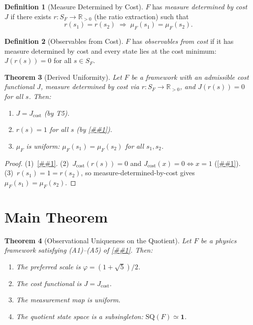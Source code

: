 \documentclass[11pt]{article}
\providecommand{\cref}[1]{\ref{##1}}%
\providecommand{\Cref}[1]{\ref{##1}}%
\newcommand{\Rp}{\mathbb{R}_{>0}}
\newcommand{\Jcost}{J_{\mathrm{cost}}}
\newcommand{\SQ}{\mathrm{SQ}}
\newtheorem{theorem}{Theorem}[section]
\theoremstyle{definition}
\newtheorem{definition}[theorem]{Definition}
\theoremstyle{remark}
\begin{document}
\begin{definition}[Measure Determined by Cost]\label{def:measure-by-cost}
$F$ has \emph{measure determined by cost} $J$ if there exists
$r : S_F \to \Rp$ (the ratio extraction) such that
\[
r(s_1) = r(s_2) \;\Longrightarrow\; \mu_F(s_1) = \mu_F(s_2).
\]
\end{definition}

\begin{definition}[Observables from Cost]\label{def:obs-from-cost}
$F$ has \emph{observables from cost} if it has measure determined
by cost and every state lies at the cost minimum:
$J(r(s)) = 0$ for all $s \in S_F$.
\end{definition}

\begin{theorem}[Derived Uniformity]\label{thm:derived-uniform}
Let $F$ be a framework with an admissible cost functional $J$,
measure determined by cost via $r : S_F \to \Rp$,
and $J(r(s)) = 0$ for all $s$.
Then:
\begin{enumerate}
\item $J = \Jcost$ \;\textup{(}by T5\textup{)}.
\item $r(s) = 1$ for all $s$
  \;\textup{(}by \cref{cor:unique-min}\textup{)}.
\item $\mu_F$ is uniform: $\mu_F(s_1) = \mu_F(s_2)$
  for all $s_1, s_2$.
\end{enumerate}
\end{theorem}
\begin{proof}
(1)~\Cref{thm:t5}.
(2)~$\Jcost(r(s)) = 0$ and $\Jcost(x) = 0 \Leftrightarrow x = 1$
(\cref{cor:unique-min}).
(3)~$r(s_1) = 1 = r(s_2)$, so measure-determined-by-cost gives
$\mu_F(s_1) = \mu_F(s_2)$.
\end{proof}

\section{Main Theorem}\label{sec:main}

\begin{theorem}[Observational Uniqueness on the Quotient]
\label{thm:main}
Let $F$ be a physics framework satisfying
\textup{(A1)--(A5)} of \cref{def:assumptions}.
Then:
\begin{enumerate}
\item The preferred scale is $\varphi = (1 + \sqrt{5})/2$.
\item The cost functional is $J = \Jcost$.
\item The measurement map is uniform.
\item The quotient state space is a subsingleton:
  $\SQ(F) \simeq \mathbf{1}$.
\end{enumerate}
\end{theorem}
\end{document}
